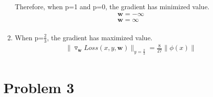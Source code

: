 \documentclass[12pt]{article}
\begin{document}
\begin{enumerate}[label=(\alph*)]
  Therefore, when p=1 and p=0, the gradient has minimized value.
  \begin{align*}
  \mathbf{w}= - \infty \\
  \mathbf{w}= \infty\\
  \end{align*}

  \item
  When p=$\frac {2}{3}$, the gradient has maximized value.
  \begin{align*}
    \parallel\triangledown_{\mathbf{w}}Loss(x, y, \mathbf{w})\parallel_{y=\frac{2}{3}}=\frac{8}{27}\parallel\phi(x)\parallel\\
  \end{align*}
\end{enumerate}
\newpage
\section*{Problem 3}
\end{document}
